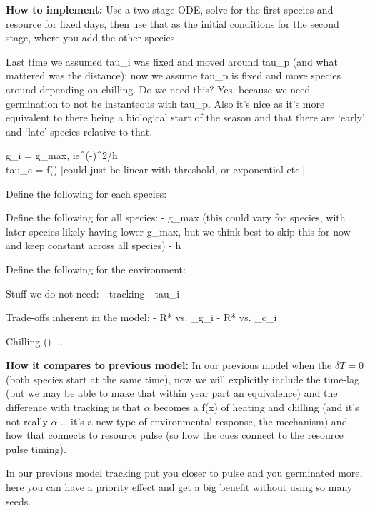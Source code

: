 \documentclass[11pt,letter]{article}
\begin{document}

\renewcommand{\refname}{\CHead{}}


{\bf How to implement:} Use a two-stage ODE, solve for the first species and resource for fixed days, then use that as the initial conditions for the second stage, where you add the other species 

Last time we assumed tau_i was fixed and moved around tau_p (and what mattered was the distance); now we assume tau_p is fixed and move species around depending on chilling. Do we need this? Yes, because we need germination to not be instanteous with tau_p. Also it's nice as it's more equivalent to there being a biological start of the season and that there are `early' and `late' species relative to that.

g_i = g_{max, i}e^{(-\xi)^2/h}\\
tau_c = f(\xi) [could just be linear with threshold, or exponential etc.]


Define the following for each species:


Define the following for all species:
- g_max (this could vary for species, with later species likely having lower g_max, but we think best to skip this for now and keep constant across all species) 
- h

Define the following for the environment:



Stuff we do not need:
- tracking
- tau_i

Trade-offs inherent in the model:
- R* vs. \tau_g_i
- R* vs. \tau_c_i

Chilling (\xi) ... 

{\bf How it compares to previous model:} 
In our previous model when the $\delta T = 0$ (both species start at the same time), now we will explicitly include the time-lag (but we may be able to make that within year part an equivalence) and the difference with tracking is that $\alpha$ becomes a f(x) of heating and chilling (and it’s not really $\alpha$ … it’s a new type of environmental response, the mechanism) and how that connects to resource pulse (so how the cues connect to the resource pulse timing).

In our previous model tracking put you closer to pulse and you germinated more, here you can have a priority effect and get a big benefit without using so many seeds. 
\end{document}
